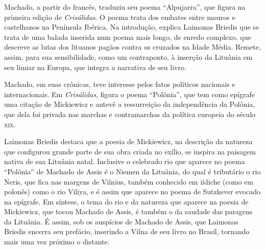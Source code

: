 Machado, a partir do francês, traduziu seu poema ``Alpujarra'', que
figura na primeira edição de \textit{Crisálidas}. O poema trata dos
embates entre mouros e castelhanos na Península Ibérica. Na introdução,
explica Laimonas Briedis que se trata de uma balada inserida num poema
mais longo, de enredo complexo, que descreve as lutas dos lituanos
pagãos contra os cruzados na Idade Média. Remete, assim, para sua
sensibilidade, como um contraponto, à inserção da Lituânia em seu limiar
na Europa, que integra a narrativa de seu livro.

Machado, em suas crônicas, teve interesse pelos fatos políticos
nacionais e internacionais. Em \textit{Crisálidas}, figura o poema
``Polônia'', que tem como epígrafe uma citação de Mickiewicz e antevê a
ressurreição da independência da Polônia, que dela foi privada nas
marchas e contramarchas da política europeia do século \textsc{xix}.

Laimonas Briedis destaca que a poesia de Mickiewicz, na descrição da
natureza que configurou grande parte de sua obra criada no exílio, se
inspira na paisagem nativa de sua Lituânia natal. Inclusive o celebrado
rio que aparece no poema ``Polônia'' de Machado de Assis é o Niemen da
Lituânia, do qual é tributário o rio Neris, que fica nas margens de
Vilnius, também conhecido em iídiche (como em polonês) como o rio
Viliya, e é assim que aparece no poema de Sutzkever evocado na epígrafe.
Em síntese, o tema do rio e da natureza que aparece na poesia de
Mickiewicz, que tocou Machado de Assis, é também o da saudade das
paragens da Lituânia. É assim, sob os auspícios de Machado de Assis, que
Laimonas Briedis encerra seu prefácio, inserindo a Vilna de seu livro no
Brasil, tornando mais uma vez próximo o distante.

